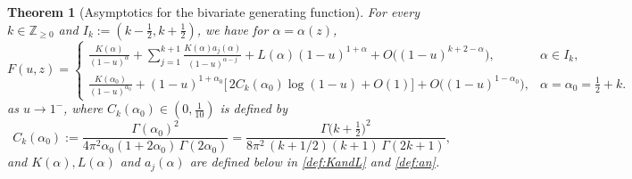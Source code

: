 \documentclass[11pt,a4paper]{article}
\numberwithin{equation}{section}
\newtheorem {theorem}{Theorem}[section]
\def\ZZ{\mathbb{Z}}
\begin{document}
\begin{theorem}[Asymptotics for the bivariate generating function]\label{thm:SingExpFuz}
For every $k\in\ZZ_{\ge 0}$ and $I_k:=(k-\tfrac{1}{2},k+\tfrac{1}{2})$, we have for $\alpha=\alpha(z)$,
\begin{equation*}
F(u,z)=
\begin{cases}
\displaystyle
    \frac{K(\alpha)}{(1-u)^{\alpha}}
    +\sum_{j=1}^{k+1} \frac{K(\alpha)a_j(\alpha)}{(1-u)^{\alpha-j}}
    +L(\alpha)(1-u)^{1+\alpha}
    +O\bigl((1-u)^{k+2-\alpha}\bigr), & \text{$\alpha\in I_k$},\\[10pt]
    \displaystyle
    \frac{K(\alpha_0)}{(1-u)^{\alpha_0}}
    +(1-u)^{1+\alpha_0}\big[\,2C_k(\alpha_0)\log(1-u)+O(1)\big]
    +O\bigl((1-u)^{1-\alpha_0}\bigr), & \alpha=\alpha_0=\tfrac12+k.
\end{cases}
\end{equation*}
as $u\to 1^-$, where $C_k(\alpha_0)\in (0,\frac{1}{10})$ is defined by
\begin{equation}\label{eq:ConstCk}
C_k(\alpha_0):=\frac{\Gamma(\alpha_0)^2}{4\pi^2\alpha_0(1+2\alpha_0)\,\Gamma(2\alpha_0)}
=\frac{\Gamma\!\bigl(k+\tfrac12\bigr)^2}{8\pi^2\,(k+1/2)(k+1)\,\Gamma(2k+1)},
\end{equation}
and $K(\alpha),L(\alpha)$ and $a_j(\alpha)$ are defined below in \eqref{def:KandL} and \eqref{def:an}.
\end{theorem}
\end{document}
